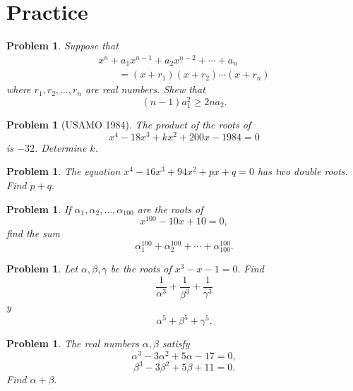 \documentclass[11pt, openany]{book}
\theoremstyle{change} \theoremheaderfont{\blue\sffamily\bfseries}
\newtheorem{pro}[thm]{Problem}
\theoremstyle{nonumberplain} \theoremheaderfont{\sffamily\bfseries}
\newcommand{\í}{\'{\i}}
\begin{document}
\section*{Practice}\begin{multicols}{2}\columnseprule 1pt \columnsep 25pt

\begin{pro}
Suppose that
$$\begin{array}{l}x^n + a_1x^{n - 1} + a_2x^{n - 2} + \cdots + a_n \\ \qquad = (x + r_1)(x + r_2)\cdots (x + r_n)\end{array}$$
where $r_1, r_2, \ldots , r_n$ are real numbers. Shew that
$$(n - 1)a_1 ^2 \geq 2na_2.$$
\end{pro}
\begin{pro}[USAMO 1984] The product of the roots of
$$x^4 - 18x^3 + kx^2 + 200x - 1984 = 0$$is $-32$. Determine  $k$.

\end{pro}
\begin{pro}
The equation $x^4 - 16x^3 + 94x^2 + px + q = 0$ has two double
roots. Find $p + q.$
\end{pro}
\begin{pro}
If $\alpha _1, \alpha _2 , \ldots , \alpha _{100}$ are the roots
of
$$x^{100} - 10x + 10 = 0,$$find the sum
$$\alpha _1 ^{100} + \alpha _2 ^{100} + \cdots + \alpha _{100} ^{100}.$$
\end{pro}
\begin{pro}
Let $\alpha , \beta , \gamma$ be the roots of $x^3 - x - 1 = 0.$
Find $$\frac{1}{\alpha ^3} + \frac{1}{\beta ^3} + \frac{1}{\gamma
^3}$$y
$$\alpha ^5 + \beta ^5 + \gamma ^5.$$
\end{pro}
\begin{pro} The real numbers $\alpha , \beta$ satisfy
$$\alpha ^3 - 3\alpha ^2 + 5\alpha - 17 = 0,$$
$$\beta ^3 - 3\beta ^2 + 5\beta + 11 = 0.$$Find $\alpha + \beta .$
\end{pro}
\end{multicols}
\end{document}
